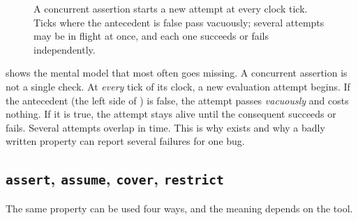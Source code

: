 \begin{figure}[htbp]
  \centering
  \caption{A concurrent assertion starts a new attempt at every clock tick.
  Ticks where the antecedent is false pass vacuously; several attempts may be
  in flight at once, and each one succeeds or fails independently.}
  \label{fig:beyond:sva}
\end{figure}

 shows the mental model that most often goes missing. A
concurrent assertion is not a single check. At \emph{every} tick of its clock,
a new evaluation attempt begins. If the antecedent (the left side of
\code{|->}) is false, the attempt passes \emph{vacuously} and costs nothing.
If it is true, the attempt stays alive until the consequent succeeds or fails.
Several attempts overlap in time. This is why  exists and
why a badly written property can report several failures for one bug.

\subsection{\texttt{assert}, \texttt{assume}, \texttt{cover}, \texttt{restrict}}

The same property can be used four ways, and the meaning depends on the tool.

